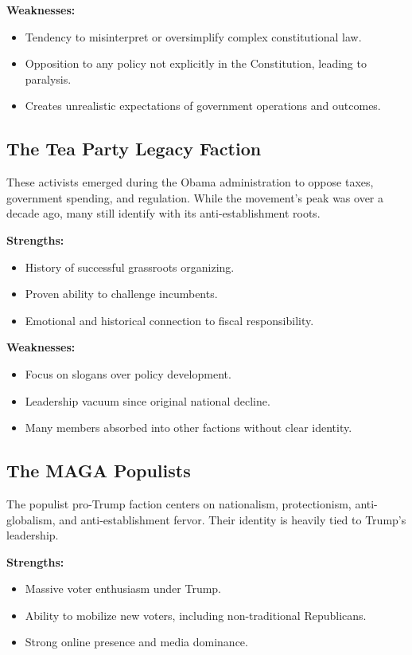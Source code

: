 \textbf{Weaknesses:}
\begin{itemize}
\item Tendency to misinterpret or oversimplify complex constitutional law.
\item Opposition to any policy not explicitly in the Constitution, leading to paralysis.
\item Creates unrealistic expectations of government operations and outcomes.
\end{itemize}

\subsection{The Tea Party Legacy Faction}
These activists emerged during the Obama administration to oppose taxes, government spending, and regulation. While the movement’s peak was over a decade ago, many still identify with its anti-establishment roots.

\textbf{Strengths:}
\begin{itemize}
\item History of successful grassroots organizing.
\item Proven ability to challenge incumbents.
\item Emotional and historical connection to fiscal responsibility.
\end{itemize}

\textbf{Weaknesses:}
\begin{itemize}
\item Focus on slogans over policy development.
\item Leadership vacuum since original national decline.
\item Many members absorbed into other factions without clear identity.
\end{itemize}

\subsection{The MAGA Populists}
The populist pro-Trump faction centers on nationalism, protectionism, anti-globalism, and anti-establishment fervor. Their identity is heavily tied to Trump’s leadership.

\textbf{Strengths:}
\begin{itemize}
\item Massive voter enthusiasm under Trump.
\item Ability to mobilize new voters, including non-traditional Republicans.
\item Strong online presence and media dominance.
\end{itemize}

